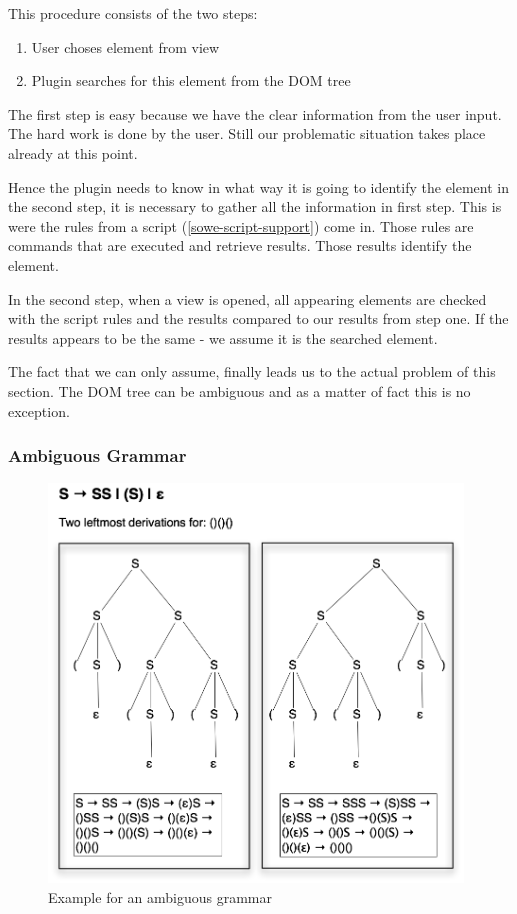 This procedure consists of the two steps:
\begin{enumerate}
	\item User choses element from view
	\item Plugin searches for this element from the DOM tree
\end{enumerate}

The first step is easy because we have the clear information from the user input. The hard work is done by the user. Still our problematic situation takes place already at this point. 

Hence the plugin needs to know in what way it is going to identify the element in the second step, it is necessary to gather all the information in first step. This is were the rules from a script (\ref{sowe-script-support}) come in. Those rules are commands that are executed and retrieve results. Those results identify the element. 

In the second step, when a view is opened, all appearing elements are checked with the script rules and the results compared to our results from step one. If the results appears to be the same - we assume it is the searched element. 

The fact that we can only assume, finally leads us to the actual problem of this section. The DOM tree can be ambiguous and as a matter of fact this is no exception.

\subsubsection{Ambiguous Grammar}
\begin{figure}[h!] \centering
		\includegraphics[width=11cm]{images/ambiguous-grammar.png}
		\caption{Example for an ambiguous grammar}
		\label{ambiguous-grammar-pic}
\end{figure} 

